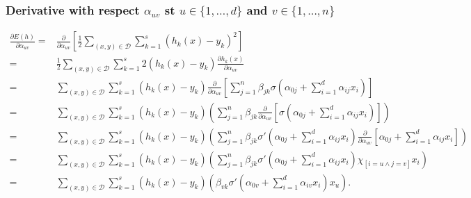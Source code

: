 \begin{frame}
  \frametitle{Derivative with respect $\alpha_{u v}$ st $u \in \{1, \ldots, d\}$ and $v \in \{1, \ldots, n\}$}

  {\tiny
  \begin{align} \label{eq:parcial_alpha_i}
    \frac{\partial E(h)}{\partial \alpha_{u v}} 
    =&
    \frac{\partial}{\partial \alpha_{u v}}
    \left[
        \frac{1}{2}
        \sum_{(x,y) \in \mathcal{D}}
        \sum_{k = 1}^s 
        \left(h_k(x) - y_k \right)^2
    \right]
    \\ %
    = &
    \frac{1}{2}
    \sum_{(x,y) \in \mathcal{D}}
    \sum_{k = 1}^s 
    2 \left(h_k(x) - y_k \right)
    \frac{\partial h_k(x)}{\partial \alpha_{u v}} 
    \\ 
    = & %
    \sum_{(x,y) \in \mathcal{D}}
    \sum_{k = 1}^s 
    \left(h_k(x) - y_k \right)
    \frac{\partial}{\partial \alpha_{u v}} 
    \left[
        \sum_{j = 1}^n 
            \beta_{j k}
            \sigma
            \left(  
                \alpha_{0 j} +
                \sum_{i=1}^d \alpha_{i j}x_i
            \right)
    \right] 
    \\ 
    = & %
    \sum_{(x,y) \in \mathcal{D}}
    \sum_{k = 1}^s 
    \left(h_k(x) - y_k \right)
    \left(
        \sum_{j = 1}^n 
        \beta_{j k}
        \frac{\partial}{\partial \alpha_{u v}} 
        \left[
            \sigma
            \left(  
                \alpha_{0 j} +
                \sum_{i=1}^d \alpha_{i j}x_i
            \right)
        \right]
    \right) 
    \\ 
    = & %
    \sum_{(x,y) \in \mathcal{D}}
    \sum_{k = 1}^s 
    \left(h_k(x) - y_k \right)
    \left(
        \sum_{j = 1}^n 
        \beta_{j k}
        \sigma '
        \left(  
            \alpha_{0 j} +
            \sum_{i=1}^d \alpha_{i j}x_i
        \right)
        \frac{\partial}{\partial \alpha_{u v}}    
        \left[
            \alpha_{0 j} +
            \sum_{i=1}^d \alpha_{i j}x_i
        \right]
    \right) 
    \\ 
    = & %
    \sum_{(x,y) \in \mathcal{D}}
    \sum_{k = 1}^s 
    \left(h_k(x) - y_k \right)
    \left(
        \sum_{j = 1}^n 
        \beta_{j k}
        \sigma '
        \left(  
            \alpha_{0 j} +
            \sum_{i=1}^d \alpha_{i j}x_i
        \right)   
        \chi_{[i = u\wedge j = v]}x_i
    \right) 
    \\ 
    = & %
    \sum_{(x,y) \in \mathcal{D}}
    \sum_{k = 1}^s 
    \left(h_k(x) - y_k \right)
    \left(
        \beta_{v k}
        \sigma '
        \left(  
            \alpha_{0 v} +
            \sum_{i=1}^d \alpha_{i v}x_i
        \right)x_u   
    \right).
\end{align}
  }
\end{frame}


